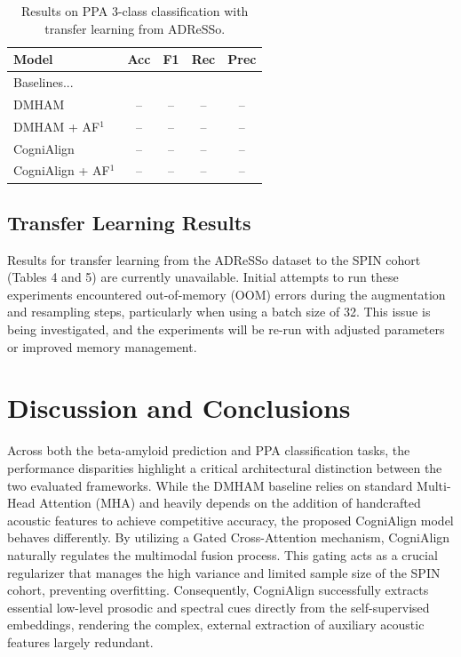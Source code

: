 \documentclass{Odyssey2026}
\begin{document}
\begin{table}[h]
    \centering
    \caption{Results on PPA 3-class classification with transfer learning from ADReSSo.}
    \begin{tabular}{lcccc}
        \toprule
        \textbf{Model} & \textbf{Acc} & \textbf{F1} & \textbf{Rec} & \textbf{Prec} \\
        \midrule
        Baselines... & & & & \\
        DMHAM           & -- & -- & -- & -- \\
        DMHAM + AF$^1$  & -- & -- & -- & -- \\
        CogniAlign        & -- & -- & -- & -- \\
        CogniAlign + AF$^1$ & -- & -- & -- & -- \\
        \bottomrule
    \end{tabular}
\end{table}


\subsection{Transfer Learning Results}
Results for transfer learning from the ADReSSo dataset to the SPIN cohort (Tables 4 and 5) are currently unavailable. Initial attempts to run these experiments encountered out-of-memory (OOM) errors during the augmentation and resampling steps, particularly when using a batch size of 32. This issue is being investigated, and the experiments will be re-run with adjusted parameters or improved memory management.



\section{Discussion and Conclusions}

Across both the beta-amyloid prediction and PPA classification tasks, the performance disparities highlight a critical architectural distinction between the two evaluated frameworks. While the DMHAM baseline relies on standard Multi-Head Attention (MHA) and heavily depends on the addition of handcrafted acoustic features to achieve competitive accuracy, the proposed CogniAlign model behaves differently. By utilizing a Gated Cross-Attention mechanism, CogniAlign naturally regulates the multimodal fusion process. This gating acts as a crucial regularizer that manages the high variance and limited sample size of the SPIN cohort, preventing overfitting. Consequently, CogniAlign successfully extracts essential low-level prosodic and spectral cues directly from the self-supervised embeddings, rendering the complex, external extraction of auxiliary acoustic features largely redundant.
\end{document}
